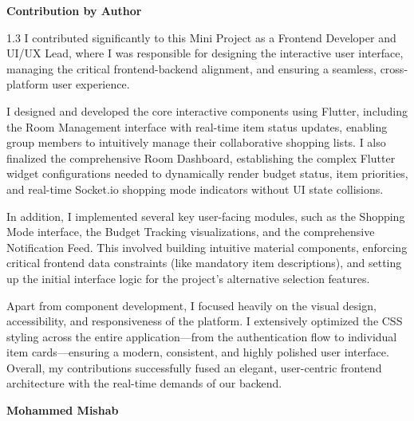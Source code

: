 \documentclass[a4paper,12pt]{article}
\begin{document}
\newpage
\thispagestyle{empty}
\begin{center}
{\Large \textbf{Contribution by Author}}\\[1cm]
\end{center}
\begin{spacing}{1.3}
I contributed significantly to this Mini Project as a Frontend Developer and UI/UX Lead, where I was responsible for designing the interactive user interface, managing the critical frontend-backend alignment, and ensuring a seamless, cross-platform user experience.

I designed and developed the core interactive components using Flutter, including the Room Management interface with real-time item status updates, enabling group members to intuitively manage their collaborative shopping lists. I also finalized the comprehensive Room Dashboard, establishing the complex Flutter widget configurations needed to dynamically render budget status, item priorities, and real-time Socket.io shopping mode indicators without UI state collisions.

In addition, I implemented several key user-facing modules, such as the Shopping Mode interface, the Budget Tracking visualizations, and the comprehensive Notification Feed. This involved building intuitive material components, enforcing critical frontend data constraints (like mandatory item descriptions), and setting up the initial interface logic for the project's alternative selection features.

Apart from component development, I focused heavily on the visual design, accessibility, and responsiveness of the platform. I extensively optimized the CSS styling across the entire application---from the authentication flow to individual item cards---ensuring a modern, consistent, and highly polished user interface. Overall, my contributions successfully fused an elegant, user-centric frontend architecture with the real-time demands of our backend.

\begin{flushright}
\textbf{Mohammed Mishab}
\end{flushright}
\end{spacing}
\end{document}
